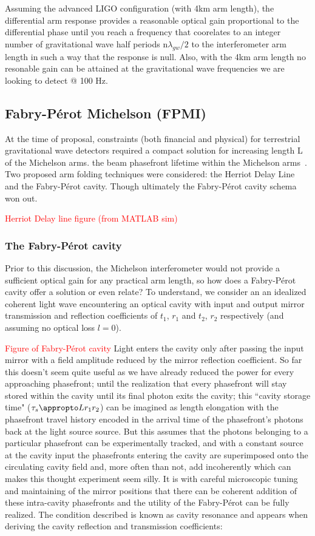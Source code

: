 Assuming the advanced LIGO configuration (with 4km arm length), the differential arm response provides a reasonable optical gain proportional to the differential phase until you reach a frequency that coorelates to an integer number of gravitational wave half periods $\mathrm{n}\lambda_{gw} / 2$ to the interferometer arm length in such a way that the response is null. Also, with the 4km arm length no resonable gain can be attained at the gravitational wave frequencies we are looking to detect @ 100 Hz. 

\subsection{Fabry-P\'{e}rot Michelson (FPMI)}
At the time of proposal, constraints (both financial and physical) for terrestrial gravitational wave detectors required a compact solution for increasing length L of the Michelson arms. the beam phasefront lifetime within the Michelson arms~\cite{}. Two proposed arm folding techniques were considered: the Herriot Delay Line and the Fabry-P\'{e}rot cavity. Though ultimately the Fabry-P\'{e}rot cavity schema won out.

\textcolor{red}{Herriot Delay line figure (from MATLAB sim)}


\subsubsection{The Fabry-P\'{e}rot cavity}
\label{section:FPC}
Prior to this discussion, the Michelson interferometer would not provide a sufficient optical gain for any practical arm length, so how does a Fabry-P\'{e}rot cavity offer a solution or even relate? To understand, we consider an an idealized coherent light wave encountering an optical cavity with input and output mirror transmission and reflection coefficients of $t_1$, $r_1$ and $t_2$, $r_2$ respectively (and assuming no optical loss $l=0$).

\textcolor{red}{Figure of Fabry-P\'{e}rot cavity}
Light enters the cavity only after passing the input mirror with a field amplitude reduced by the mirror reflection coefficient. So far this doesn't seem quite useful as we have already reduced the power for every approaching phasefront; until the realization that every phasefront will stay stored within the cavity until its final photon exits the cavity; this ``cavity storage time" ($\tau_s \appropto L r_1r_2$) can be imagined as length elongation with the phasefront travel history encoded in the arrival time of the phasefront's photons back at the light source source. But this assumes that the photons belonging to a particular phasefront can be experimentally tracked, and with a constant source at the cavity input the phasefronts entering the cavity are superimposed onto the circulating cavity field and, more often than not, add incoherently which can makes this thought experiment seem silly. It is with careful microscopic tuning and maintaining of the mirror positions that there can be coherent addition of these intra-cavity phasefronts and the utility of the Fabry-P\'{e}rot can be fully realized. The condition described is known as cavity resonance and appears when deriving the cavity reflection and transmission coefficients:


